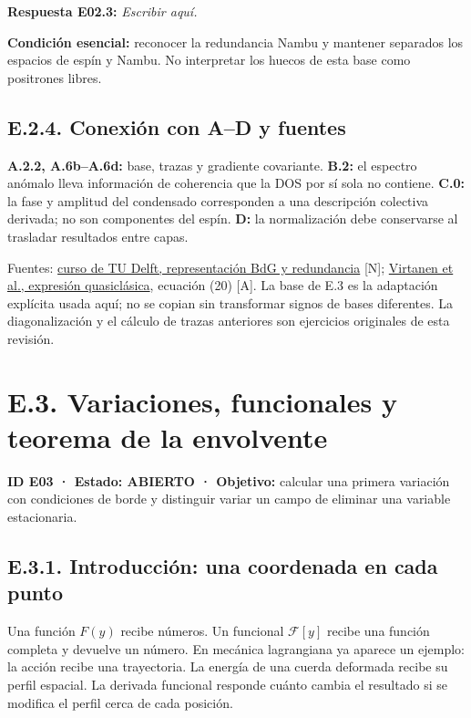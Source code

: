 \documentclass[
  spanish,
  10pt,
  a4paper,
]{article}
\begin{document}
\textbf{Respuesta E02.3:} \emph{Escribir aquí.}

\textbf{Condición esencial:} reconocer la redundancia Nambu y mantener
separados los espacios de espín y Nambu. No interpretar los huecos de
esta base como positrones libres.

\subsection{E.2.4. Conexión con A--D y
fuentes}\label{e.2.4.-conexiuxf3n-con-ad-y-fuentes}

\textbf{A.2.2, A.6b--A.6d:} base, trazas y gradiente covariante.
\textbf{B.2:} el espectro anómalo lleva información de coherencia que la
DOS por sí sola no contiene. \textbf{C.0:} la fase y amplitud del
condensado corresponden a una descripción colectiva derivada; no son
componentes del espín. \textbf{D:} la normalización debe conservarse al
trasladar resultados entre capas.

Fuentes: \href{https://topocondmat.org/test/w1_topointro/0d.html}{curso
de TU Delft, representación BdG y redundancia} {[}N{]};
\href{https://arxiv.org/pdf/1909.00992v1}{Virtanen et al., expresión
quasiclásica}, ecuación (20) {[}A{]}. La base de E.3 es la adaptación
explícita usada aquí; no se copian sin transformar signos de bases
diferentes. La diagonalización y el cálculo de trazas anteriores son
ejercicios originales de esta revisión.

\newpage

\section{E.3. Variaciones, funcionales y teorema de la
envolvente}\label{e.3.-variaciones-funcionales-y-teorema-de-la-envolvente}

\textbf{ID E03 · Estado: ABIERTO · Objetivo:} calcular una primera
variación con condiciones de borde y distinguir variar un campo de
eliminar una variable estacionaria.

\subsection{E.3.1. Introducción: una coordenada en cada
punto}\label{e.3.1.-introducciuxf3n-una-coordenada-en-cada-punto}

Una función \(F(y)\) recibe números. Un funcional \(\mathcal F[y]\)
recibe una función completa y devuelve un número. En mecánica
lagrangiana ya aparece un ejemplo: la acción recibe una trayectoria. La
energía de una cuerda deformada recibe su perfil espacial. La derivada
funcional responde cuánto cambia el resultado si se modifica el perfil
cerca de cada posición.
\end{document}
